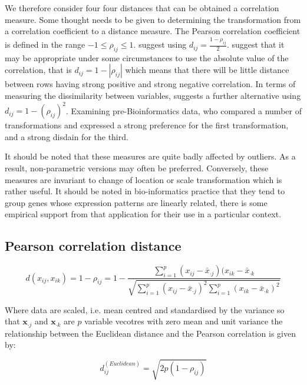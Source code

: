 We therefore consider four four distances that can be obtained a correlation measure.  Some thought needs to be given to determining the transformation from a correlation coefficient to a distance measure.   The Pearson correlation coefficient is defined in the range $-1 \leq \rho_{ij} \leq 1$.   \cite{Everitt+etal:2001} suggest using $d_{ij} = \frac{1 - \rho_{ij}}{2}$.  \cite{Gentleman+etal:2005} suggest that it may be appropriate under some circumstances to use the absolute value of the correlation, that is $d_{ij} = 1 - |\rho_{ij}|$ which means that there will be little distance between rows having strong positive and strong negative correlation.   In terms of measuring the dissimilarity between variables, \cite{Krzanowski:2000} suggests a further alternative using  $d_{ij} = 1 - (\rho_{ij})^{2}$.   Examining pre-Bioinformatics data, \cite{Lance+Williams:1979} who compared a number of transformations and expressed a strong preference for the first transformation, and a strong disdain for the third.

It should be noted that these measures are quite badly affected by outliers.   As a result, non-parametric versions may often be preferred.   Conversely, these measures are invariant to change of location or scale transformation which is rather useful.   It should be noted in bio-informatics practice that they tend to group genes whose expression patterns are linearly related, there is some empirical support from that application for their use in a particular context.

\subsection{Pearson correlation distance}
\label{pearsondist}

\begin{displaymath}
\label{pearsondistF}
d(x_{ij},x_{ik}) = 1 - \rho_{ij} = 1 - \frac{\sum_{i=1}^{p} (x_{ij} - \bar{x}_{\cdot j}) (x_{ik} - \bar{x}_{\cdot k}}{\sqrt{\sum_{i=1}^{p} (x_{ij} - \bar{x}_{\cdot j})^{2} \sum_{i=1}^{p} (x_{ik} - \bar{x}_{\cdot k})^{2}}}
\end{displaymath}

Where data are scaled, i.e. mean centred and standardised by the variance so that $\boldsymbol{x}_{\cdot j}$ and $\boldsymbol{x}_{\cdot k}$ are $p$ variable vecotres with zero mean and unit variance the relationship between the Euclidean distance and the Pearson correlation is given by:

\begin{displaymath}
d_{ij}^{(Euclidean)} = \sqrt{2p(1-\rho_{ij})}
\end{displaymath}

